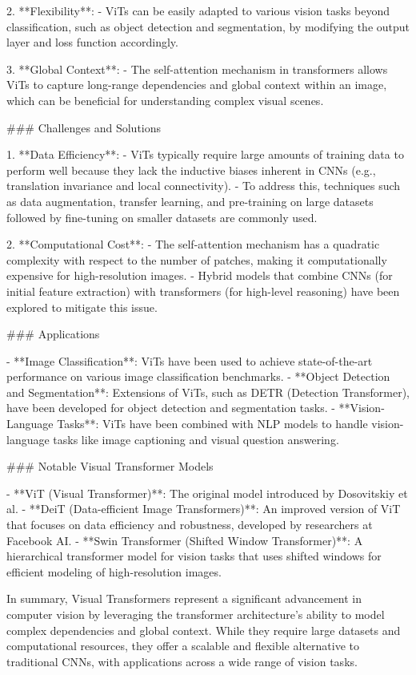 2. **Flexibility**:
   - ViTs can be easily adapted to various vision tasks beyond classification, such as object detection and segmentation, by modifying the output layer and loss function accordingly.

3. **Global Context**:
   - The self-attention mechanism in transformers allows ViTs to capture long-range dependencies and global context within an image, which can be beneficial for understanding complex visual scenes.

### Challenges and Solutions

1. **Data Efficiency**:
   - ViTs typically require large amounts of training data to perform well because they lack the inductive biases inherent in CNNs (e.g., translation invariance and local connectivity).
   - To address this, techniques such as data augmentation, transfer learning, and pre-training on large datasets followed by fine-tuning on smaller datasets are commonly used.

2. **Computational Cost**:
   - The self-attention mechanism has a quadratic complexity with respect to the number of patches, making it computationally expensive for high-resolution images.
   - Hybrid models that combine CNNs (for initial feature extraction) with transformers (for high-level reasoning) have been explored to mitigate this issue.

### Applications

- **Image Classification**: ViTs have been used to achieve state-of-the-art performance on various image classification benchmarks.
- **Object Detection and Segmentation**: Extensions of ViTs, such as DETR (Detection Transformer), have been developed for object detection and segmentation tasks.
- **Vision-Language Tasks**: ViTs have been combined with NLP models to handle vision-language tasks like image captioning and visual question answering.

### Notable Visual Transformer Models

- **ViT (Visual Transformer)**: The original model introduced by Dosovitskiy et al.
- **DeiT (Data-efficient Image Transformers)**: An improved version of ViT that focuses on data efficiency and robustness, developed by researchers at Facebook AI.
- **Swin Transformer (Shifted Window Transformer)**: A hierarchical transformer model for vision tasks that uses shifted windows for efficient modeling of high-resolution images.

In summary, Visual Transformers represent a significant advancement in computer vision by leveraging the transformer architecture's ability to model complex dependencies and global context. While they require large datasets and computational resources, they offer a scalable and flexible alternative to traditional CNNs, with applications across a wide range of vision tasks.

